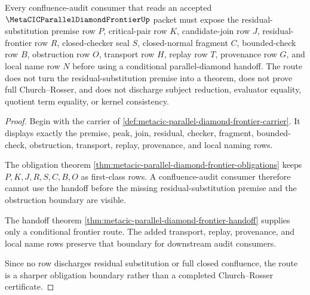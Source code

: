 \begin{theorem}
\label{thm:metacic-parallel-diamond-frontier-route}
Every confluence-audit consumer that reads an accepted $\MetaCICParallelDiamondFrontierUp$ packet must expose the residual-substitution premise row $P$, critical-pair row $K$, candidate-join row $J$, residual-frontier row $R$, closed-checker seal $S$, closed-normal fragment $C$, bounded-check row $B$, obstruction row $O$, transport row $H$, replay row $T$, provenance row $G$, and local name row $N$ before using a conditional parallel-diamond handoff. The route does not turn the residual-substitution premise into a theorem, does not prove full Church--Rosser, and does not discharge subject reduction, evaluator equality, quotient term equality, or kernel consistency.
\end{theorem}
\begin{proof}
Begin with the carrier of \autoref{def:metacic-parallel-diamond-frontier-carrier}. It displays exactly the premise, peak, join, residual, checker, fragment, bounded-check, obstruction, transport, replay, provenance, and local naming rows.

The obligation theorem \autoref{thm:metacic-parallel-diamond-frontier-obligations} keeps $P,K,J,R,S,C,B,O$ as first-class rows. A confluence-audit consumer therefore cannot use the handoff before the missing residual-substitution premise and the obstruction boundary are visible.

The handoff theorem \autoref{thm:metacic-parallel-diamond-frontier-handoff} supplies only a conditional frontier route. The added transport, replay, provenance, and local name rows preserve that boundary for downstream audit consumers.

Since no row discharges residual substitution or full closed confluence, the route is a sharper obligation boundary rather than a completed Church--Rosser certificate.
\end{proof}

